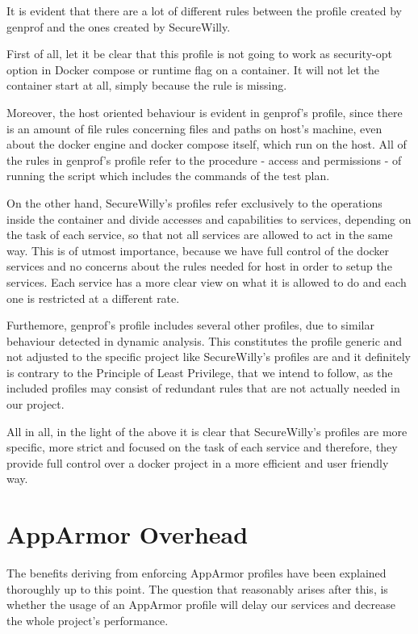 It is evident that there are a lot of different rules between the profile created by genprof and the ones created by SecureWilly.

First of all, let it be clear that this profile is not going to work as security-opt option in Docker compose or runtime flag on a container. It will not let the container start at all, simply because the  rule is missing.

Moreover, the host oriented behaviour is evident in genprof's profile, since there is an amount of file rules concerning files and paths on host's machine, even about the docker engine and docker compose itself, which run on the host. All of the rules in genprof's profile refer to the procedure - access and permissions - of running the script which includes the commands of the test plan.

On the other hand, SecureWilly's profiles refer exclusively to the operations inside the container and divide accesses and capabilities to services, depending on the task of each service, so that not all services are allowed to act in the same way. This is of utmost importance, because we have full control of the docker services and no concerns about the rules needed for host in order to setup the services. Each service has a more clear view on what it is allowed to do and each one is restricted at a different rate.

Furthemore, genprof's profile includes several other profiles, due to similar behaviour detected in dynamic analysis. This constitutes the profile generic and not adjusted to the specific project like SecureWilly's profiles are and it definitely is contrary to the Principle of Least Privilege, that we intend to follow, as the included profiles may consist of redundant rules that are not actually needed in our project.

All in all, in the light of the above it is clear that SecureWilly's profiles are more specific, more strict and focused on the task of each service and therefore, they provide full control over a docker project in a more efficient and user friendly way.

\section{AppArmor Overhead}

The benefits deriving from enforcing AppArmor profiles have been explained thoroughly up to this point. The question that reasonably arises after this, is whether the usage of an AppArmor profile will delay our services and decrease the whole project's performance. 

